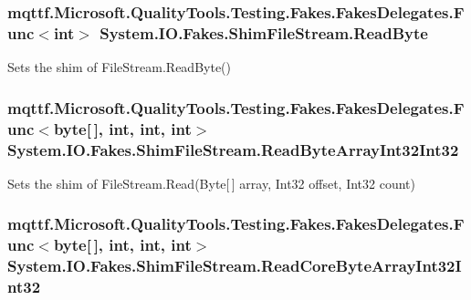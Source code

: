 \hypertarget{class_system_1_1_i_o_1_1_fakes_1_1_shim_file_stream_aa8f842c14e6454f1dcd5227bcc2a74d8}{
\subsubsection[{Read\-Byte}]{\setlength{\rightskip}{0pt plus 5cm}mqttf.\-Microsoft.\-Quality\-Tools.\-Testing.\-Fakes.\-Fakes\-Delegates.\-Func$<$int$>$ System.\-I\-O.\-Fakes.\-Shim\-File\-Stream.\-Read\-Byte\hspace{0.3cm}{\ttfamily [set]}}}\label{class_system_1_1_i_o_1_1_fakes_1_1_shim_file_stream_aa8f842c14e6454f1dcd5227bcc2a74d8}


Sets the shim of File\-Stream.\-Read\-Byte()

\hypertarget{class_system_1_1_i_o_1_1_fakes_1_1_shim_file_stream_a97353d69e4c0ef200c27247815622c7b}{
\subsubsection[{Read\-Byte\-Array\-Int32\-Int32}]{\setlength{\rightskip}{0pt plus 5cm}mqttf.\-Microsoft.\-Quality\-Tools.\-Testing.\-Fakes.\-Fakes\-Delegates.\-Func$<$byte\mbox{[}$\,$\mbox{]}, int, int, int$>$ System.\-I\-O.\-Fakes.\-Shim\-File\-Stream.\-Read\-Byte\-Array\-Int32\-Int32\hspace{0.3cm}{\ttfamily [set]}}}\label{class_system_1_1_i_o_1_1_fakes_1_1_shim_file_stream_a97353d69e4c0ef200c27247815622c7b}


Sets the shim of File\-Stream.\-Read(\-Byte\mbox{[}$\,$\mbox{]} array, Int32 offset, Int32 count)

\hypertarget{class_system_1_1_i_o_1_1_fakes_1_1_shim_file_stream_ab46ef0a882637a9a499f8ef88d00b650}{
\subsubsection[{Read\-Core\-Byte\-Array\-Int32\-Int32}]{\setlength{\rightskip}{0pt plus 5cm}mqttf.\-Microsoft.\-Quality\-Tools.\-Testing.\-Fakes.\-Fakes\-Delegates.\-Func$<$byte\mbox{[}$\,$\mbox{]}, int, int, int$>$ System.\-I\-O.\-Fakes.\-Shim\-File\-Stream.\-Read\-Core\-Byte\-Array\-Int32\-Int32\hspace{0.3cm}{\ttfamily [set]}}}\label{class_system_1_1_i_o_1_1_fakes_1_1_shim_file_stream_ab46ef0a882637a9a499f8ef88d00b650}


